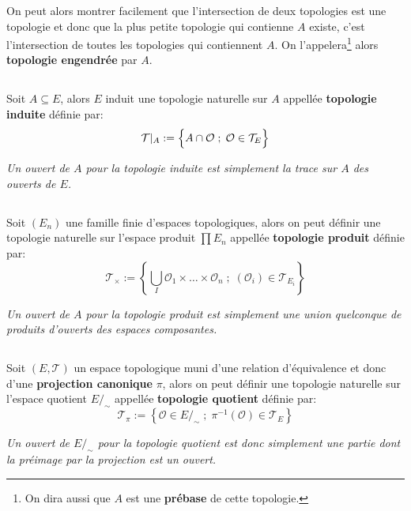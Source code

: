 On peut alors montrer facilement que l'intersection de deux topologies est une topologie et donc que la plus petite topologie qui contienne \(A\) existe, c'est l'intersection de toutes les topologies qui contiennent \(A\). On l'appelera\footnote[2]{On dira aussi que \(A\) est une \textbf{prébase} de cette topologie.} alors \textbf{topologie engendrée} par \(A\).
\subsection*{}
Soit \(A \subseteq E\), alors \(E\) induit une topologie naturelle sur \(A\) appellée \textbf{topologie induite} définie par:
\[
   \mathcal{T}\vert_A := \Bigl\{ A \cap \mathcal{O} \; ; \; \mathcal{O} \in \mathcal{T}_E \Bigl\}  
\]
\begin{center}
   \textit{Un ouvert de \(A\) pour la topologie induite est simplement la trace sur \(A\) des ouverts de \(E\).}
\end{center}
\subsection*{}
Soit \((E_n)\) une famille finie d'espaces topologiques, alors on peut définir une topologie naturelle sur l'espace produit \(\prod E_n\) appellée \textbf{topologie produit} définie par:
\[
   \mathcal{T}_\times := \left\{ \bigcup_I \mathcal{O}_1 \times \ldots \times \mathcal{O}_n \; ; \; (\mathcal{O}_i) \in \mathcal{T}_{E_i} \right\}  
\]
\begin{center}
   \textit{Un ouvert de \(A\) pour la topologie produit est simplement une union quelconque de produits d'ouverts des espaces composantes.}
\end{center}
\pagebreak
\subsection*{}
Soit \((E, \mathcal{T})\) un espace topologique muni d'une relation d'équivalence et donc d'une \textbf{projection canonique} \(\pi\), alors on peut définir une topologie naturelle sur l'espace quotient \(E/_\sim\) appellée \textbf{topologie quotient} définie par:
\[
   \mathcal{T}_\pi := \left\{ \mathcal{O} \in  E/_\sim\; ; \; \pi^{-1}(\mathcal{O}) \in \mathcal{T}_{E} \right\}  
\]
\begin{center}
   \textit{Un ouvert de \(E/_\sim\) pour la topologie quotient est donc simplement une partie dont la préimage par la projection est un ouvert.}
\end{center}
